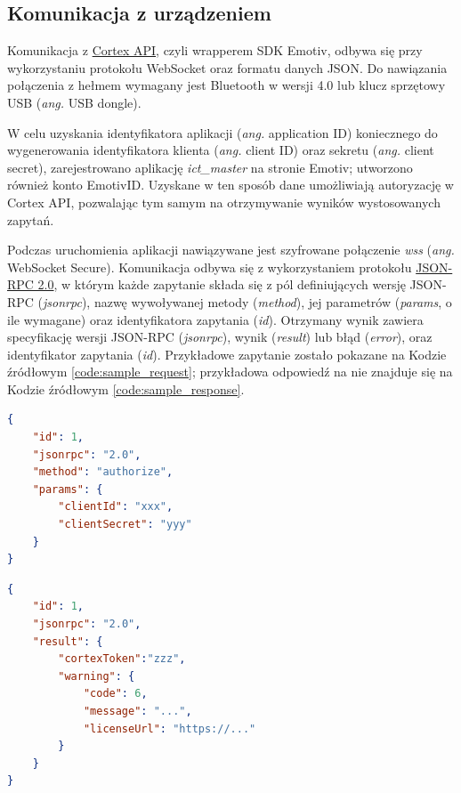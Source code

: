 \documentclass[skorowidz,skroty]{dyplomWEZUT}
\begin{document}
\subsection{Komunikacja z urządzeniem}
Komunikacja z \href{https://emotiv.gitbook.io/cortex-api/}{Cortex API}, czyli wrapperem SDK Emotiv, odbywa się przy wykorzystaniu protokołu WebSocket oraz formatu danych JSON. Do nawiązania połączenia z hełmem wymagany jest Bluetooth w wersji 4.0 lub klucz sprzętowy USB (\textit{ang.} USB dongle).

W celu uzyskania identyfikatora aplikacji (\textit{ang.} application ID) koniecznego do wygenerowania identyfikatora klienta (\textit{ang.} client ID) oraz sekretu (\textit{ang.} client secret), zarejestrowano aplikację \textit{ict\_master} na stronie Emotiv; utworzono również konto EmotivID. Uzyskane w ten sposób dane umożliwiają autoryzację w Cortex API, pozwalając tym samym na otrzymywanie wyników wystosowanych zapytań.

Podczas uruchomienia aplikacji nawiązywane jest szyfrowane połączenie \textit{wss} (\textit{ang.} WebSocket Secure). Komunikacja odbywa się z wykorzystaniem protokołu \href{https://www.jsonrpc.org/specification}{JSON-RPC 2.0}, w którym każde zapytanie składa się z pól definiujących wersję JSON-RPC (\textit{jsonrpc}), nazwę wywoływanej metody (\textit{method}), jej parametrów (\textit{params}, o ile wymagane) oraz identyfikatora zapytania (\textit{id}). Otrzymany wynik zawiera specyfikację wersji JSON-RPC (\textit{jsonrpc}), wynik (\textit{result}) lub błąd (\textit{error}), oraz identyfikator zapytania (\textit{id}). Przykładowe zapytanie zostało pokazane na Kodzie źródłowym \vref{code:sample_request}; przykładowa odpowiedź na nie znajduje się na Kodzie źródłowym \vref{code:sample_response}.

\begin{lstlisting}[language=json]
{
    "id": 1,
    "jsonrpc": "2.0",
    "method": "authorize",
    "params": {
        "clientId": "xxx",
        "clientSecret": "yyy"
    }
}
\end{lstlisting}

\begin{lstlisting}[language=json]
{
    "id": 1,
    "jsonrpc": "2.0",
    "result": {
        "cortexToken":"zzz",
        "warning": {
            "code": 6,
            "message": "...",
            "licenseUrl": "https://..."
        }
    }
}
\end{lstlisting}
\end{document}
